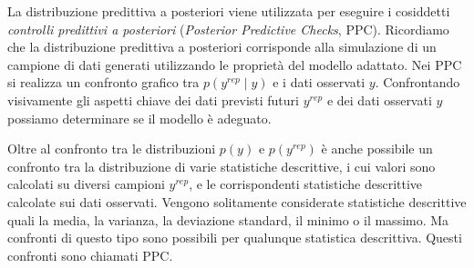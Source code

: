 \documentclass[
  11pt,
]{krantz}
\theoremstyle{definition}
\theoremstyle{definition}
\theoremstyle{definition}
\theoremstyle{definition}
\theoremstyle{remark}
\begin{document}
La distribuzione predittiva a posteriori viene utilizzata per eseguire i cosiddetti \emph{controlli predittivi a posteriori} (\emph{Posterior Predictive Checks}, PPC). Ricordiamo che la distribuzione predittiva a posteriori corrisponde alla simulazione di un campione di dati generati utilizzando le proprietà del modello adattato. Nei PPC si realizza un confronto grafico tra \(p(y^{rep} \mid y)\) e i dati osservati \(y\). Confrontando visivamente gli aspetti chiave dei dati previsti futuri \(y^{rep}\) e dei dati osservati \(y\) possiamo determinare se il modello è adeguato.

Oltre al confronto tra le distribuzioni \(p(y)\) e \(p(y^{rep})\) è anche possibile un confronto tra la distribuzione di varie statistiche descrittive, i cui valori sono calcolati su diversi campioni \(y^{rep}\), e le corrispondenti statistiche descrittive calcolate sui dati osservati. Vengono solitamente considerate statistiche descrittive quali la media, la varianza, la deviazione standard, il minimo o il massimo. Ma confronti di questo tipo sono possibili per qualunque statistica descrittiva. Questi confronti sono chiamati PPC.
\end{document}
